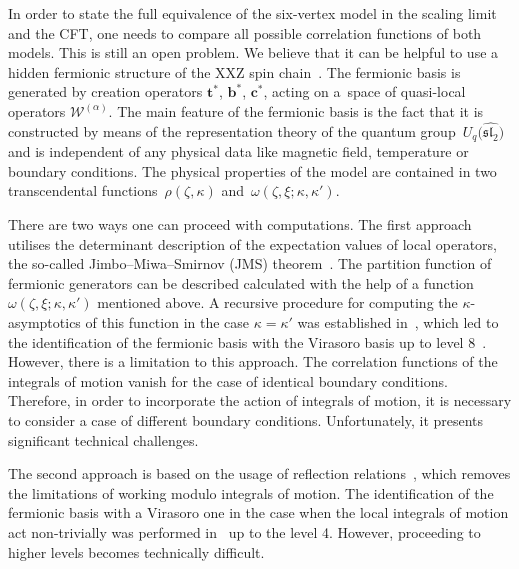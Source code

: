 \documentclass[pdftex]{sigma}
\numberwithin{equation}{section}
\begin{document}
In order to state the full equivalence of the six-vertex model in the scaling limit and the CFT, one needs to compare all possible correlation functions of both models. This is still an open problem. We believe that it can be helpful to use a hidden fermionic structure of the XXZ spin chain~\cite{HGS_4, HGS_1, HGS_2, HGS_3}. The fermionic basis is generated by creation operators $\mathbf{t}^{*}$, $\mathbf{b}^{*}$, $\mathbf{c}^{*}$, acting on a~space of quasi-local operators $\mathcal{W}^{(\alpha)}$. The main feature of the fermionic basis is the fact that it is constructed by means of the representation theory of the quantum group~$U_q\bigl(\widehat{\mathfrak{sl}_2}\bigr)$ and is independent of any physical data like magnetic field, temperature or boundary conditions. The physical properties of the model are contained in two transcendental functions~$\rho(\zeta, \kappa)$ and~$\omega(\zeta, \xi; \kappa, \kappa')$.

There are two ways one can proceed with computations. The first approach utilises the determinant description of the expectation values of local operators, the so-called Jimbo--Miwa--Smirnov (JMS) theorem~\cite{HGS_3}. The partition function of fermionic generators can be described calculated with the help of a function $\omega(\zeta, \xi; \kappa, \kappa')$ mentioned above. A recursive procedure for computing the $\kappa$-asymptotics of this function in the case $\kappa=\kappa'$ was established in~\cite{HGS_4}, which led to the identification of the fermionic basis with the Virasoro basis up to level 8~\cite{Boos_TBAE}. However, there is a limitation to this approach. The correlation functions of the integrals of motion vanish for the case of identical boundary conditions. Therefore, in order to incorporate the action of integrals of motion, it is necessary to consider a case of different boundary conditions. Unfortunately, it presents significant technical challenges.

The second approach is based on the usage of reflection relations~\cite{FFLZZ_1999, NegroSmirnov_2013}, which removes the limitations of working modulo integrals of motion. The identification of the fermionic basis with a Virasoro one in the case when the local integrals of motion act non-trivially was performed in~\cite{BoosSmirnov_2016} up to the level 4. However, proceeding to higher levels becomes technically difficult.
\end{document}
